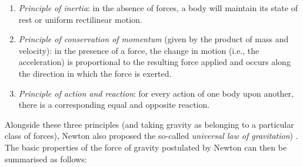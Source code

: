 \begin{enumerate}
\def\labelenumi{\arabic{enumi}.}
\item

  \emph{Principle} \emph{of inertia}: in the absence of
  forces, a body will maintain its state of rest or uniform rectilinear motion.
\item

  \emph{Principle of conservation of momentum}
   (given by the product of mass and
  velocity): in the presence of a force, the change in motion (i.e., the acceleration)
  is proportional to the resulting force applied and occurs along the direction in which
  the force is exerted.
\item

  \emph{Principle of action and reaction}: for
  every action of one body upon another, there is a corresponding equal and opposite
  reaction.
\end{enumerate}

Alongside these three principles (and taking gravity as belonging to a particular class
of forces), Newton also proposed the so-called \emph{universal law of gravitation})
. The basic
properties of the force of gravity postulated by Newton can then be summarised as
follows:


